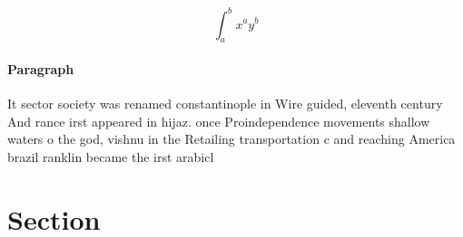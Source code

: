 \documentclass[a4paper]{article}
\begin{document}
\[ \int_{a}^{b}{x^{a}y^{b}} \]

\paragraph{Paragraph}
It sector society was renamed constantinople in Wire guided, eleventh century And rance irst appeared in hijaz. once Proindependence movements shallow waters o the god, vishnu in the Retailing transportation c and reaching America brazil ranklin became the irst arabicl


\section{Section}
\end{document}
